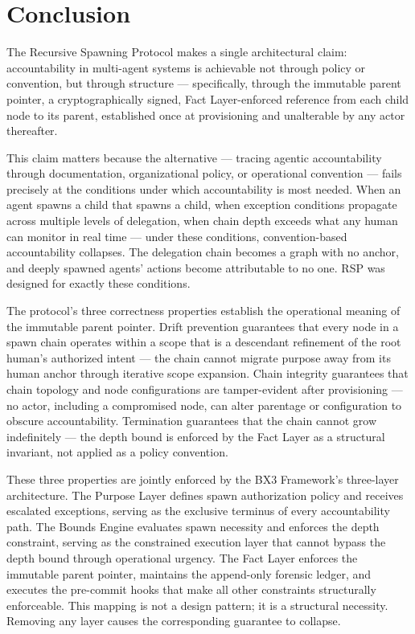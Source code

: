\section{Conclusion}
\label{sec:rs-conclusion}

The Recursive Spawning Protocol makes a single architectural claim: accountability in multi-agent systems is achievable not through policy or convention, but through structure — specifically, through the immutable parent pointer, a cryptographically signed, Fact Layer-enforced reference from each child node to its parent, established once at provisioning and unalterable by any actor thereafter.

This claim matters because the alternative — tracing agentic accountability through documentation, organizational policy, or operational convention — fails precisely at the conditions under which accountability is most needed. When an agent spawns a child that spawns a child, when exception conditions propagate across multiple levels of delegation, when chain depth exceeds what any human can monitor in real time — under these conditions, convention-based accountability collapses. The delegation chain becomes a graph with no anchor, and deeply spawned agents' actions become attributable to no one. RSP was designed for exactly these conditions.

The protocol's three correctness properties establish the operational meaning of the immutable parent pointer. Drift prevention guarantees that every node in a spawn chain operates within a scope that is a descendant refinement of the root human's authorized intent — the chain cannot migrate purpose away from its human anchor through iterative scope expansion. Chain integrity guarantees that chain topology and node configurations are tamper-evident after provisioning — no actor, including a compromised node, can alter parentage or configuration to obscure accountability. Termination guarantees that the chain cannot grow indefinitely — the depth bound is enforced by the Fact Layer as a structural invariant, not applied as a policy convention.

These three properties are jointly enforced by the BX3 Framework's three-layer architecture. The Purpose Layer defines spawn authorization policy and receives escalated exceptions, serving as the exclusive terminus of every accountability path. The Bounds Engine evaluates spawn necessity and enforces the depth constraint, serving as the constrained execution layer that cannot bypass the depth bound through operational urgency. The Fact Layer enforces the immutable parent pointer, maintains the append-only forensic ledger, and executes the pre-commit hooks that make all other constraints structurally enforceable. This mapping is not a design pattern; it is a structural necessity. Removing any layer causes the corresponding guarantee to collapse.

